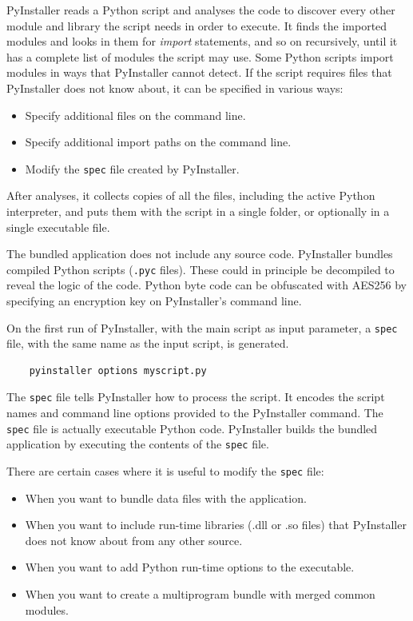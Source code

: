 PyInstaller reads a Python script and analyses the code to discover every other module and library the script needs in order to execute.
It finds the imported modules and looks in them for \textit{import} statements, and so on recursively, until it has a complete list of modules the script may use.
Some Python scripts import modules in ways that PyInstaller cannot detect. If the script requires files that PyInstaller does not know about, it can be specified in various ways:

\begin{itemize}
  \item Specify additional files on the command line.
  \item Specify additional import paths on the command line.
  \item Modify the \texttt{spec} file created by PyInstaller.
\end{itemize}

After analyses, it collects copies of all the files, including the active Python interpreter, and puts them with the script in a single folder, or optionally in a single executable file.

The bundled application does not include any source code. PyInstaller bundles compiled Python scripts (\texttt{.pyc} files). These could in principle be decompiled to reveal the logic of the code.
Python byte code can be obfuscated with AES256 by specifying an encryption key on PyInstaller's command line.

On the first run of PyInstaller, with the main script as input parameter, a \texttt{spec} file, with the same name as the input script, is generated.

\footnotesize
\begin{lstlisting}
    pyinstaller options myscript.py
\end{lstlisting}
\normalsize

The \texttt{spec} file tells PyInstaller how to process the script. It encodes the script names and command line options provided to the PyInstaller command. The \texttt{spec} file is actually executable Python code. PyInstaller builds the bundled application by executing the contents of the \texttt{spec} file.

There are certain cases where it is useful to modify the \texttt{spec} file:

\begin{itemize}
  \item When you want to bundle data files with the application.
  \item When you want to include run-time libraries (.dll or .so files) that PyInstaller does not know about from any other source.
  \item When you want to add Python run-time options to the executable.
  \item When you want to create a multiprogram bundle with merged common modules.
\end{itemize}


